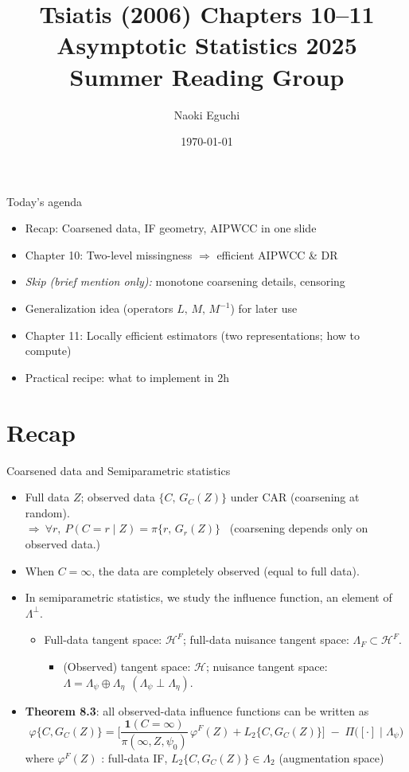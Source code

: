 \documentclass[xcolor=dvipsnames,aspectratio=169]{beamer}
\title{Tsiatis (2006) Chapters 10--11\\ \small{Asymptotic Statistics 2025 Summer Reading Group}}
\author{Naoki Eguchi}
\institute{Faculty of Medicine, Kyoto University}
\date{\today}
\newcommand{\1}{\mathbbm{1}}
\begin{document}
\begin{frame}
  \titlepage
\end{frame}

\begin{frame}{Today's agenda}
  \begin{itemize}
    \item Recap: Coarsened data, IF geometry, AIPWCC in one slide
    \item Chapter 10: Two-level missingness $\Rightarrow$ efficient AIPWCC \& DR
    \item \emph{Skip (brief mention only):} monotone coarsening details, censoring
    \item Generalization idea (operators $L,\,M,\,M^{-1}$) for later use
    \item Chapter 11: Locally efficient estimators (two representations; how to compute)
    \item Practical recipe: what to implement in 2h
  \end{itemize}
\end{frame}

\section{Recap}

\begin{frame}{Coarsened data and Semiparametric statistics}
  \begin{itemize}
    \item Full data $Z$; observed data $\{C,\,G_C(Z)\}$ under CAR (coarsening at random).\\
          $\Rightarrow\ \forall r,\ P(C=r\mid Z)=\pi\{r,\,G_r(Z)\}$ \ (coarsening depends only on observed data.)
    \item When $C=\infty$, the data are completely observed (equal to full data).
    \item In semiparametric statistics, we study the influence function, an element of $\Lambda^{\perp}$.
    \begin{itemize}
      \item Full-data tangent space: $\mathcal{H}^F$; full-data nuisance tangent space: $\Lambda_F \subset \mathcal{H}^F$.
      \begin{itemize}
        \item (Observed) tangent space: $\mathcal{H}$; nuisance tangent space:
              $\Lambda=\Lambda_{\psi}\oplus \Lambda_{\eta}\ \ (\Lambda_{\psi}\perp \Lambda_{\eta})$.
      \end{itemize}
    \end{itemize}
    \item \textbf{Theorem 8.3}: all observed-data influence functions can be written as
    \[
      \varphi \{C,G_C(Z)\}
      =
      \Biggl[
        \frac{\mathbf{1}(C=\infty)}{\pi(\infty,Z,\psi_0)}\,\varphi ^F(Z)
        + L_2\{C,G_C(Z)\}
      \Biggr]
      \;-\; \Pi\!\bigl([\cdot]\mid \Lambda_\psi\bigr)
    \]
    where $\varphi ^F(Z)$ : full-data IF, $L_2\{C,G_C(Z)\}\in \Lambda_2$ (augmentation space)
  \end{itemize}
\end{frame}
\end{document}
